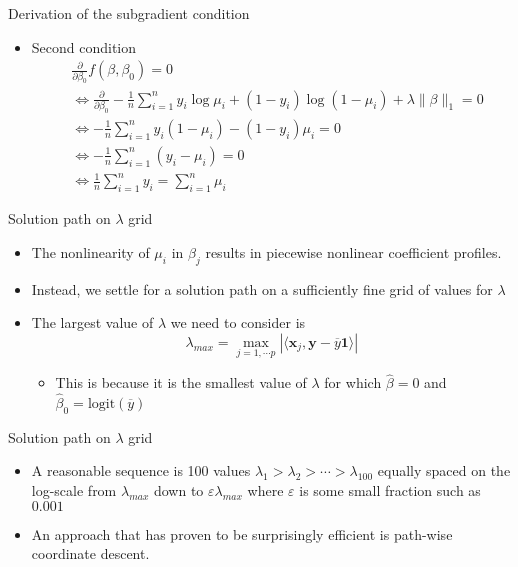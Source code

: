 \documentclass[11pt]{beamer}
\begin{document}
\begin{frame}{Derivation of the subgradient condition}
    \begin{itemize}
        \item Second condition
        \begin{align*}
            &\frac{\partial}{\partial \beta_0}f(\beta, \beta_0)=0 \\
            &\Leftrightarrow \frac{\partial}{\partial \beta_0} -\frac 1 n \sum_{i=1}^n y_i\log \mu_i +(1-y_i)\log(1-\mu_i)+\lambda \|\beta\|_1 =0 \\ 
            &\Leftrightarrow -\frac 1n \sum_{i=1}^n y_i(1-\mu_i) - (1-y_i)\mu_i   =0\\
            &\Leftrightarrow  -\frac 1n \sum_{i=1}^n (y_i-\mu_i) =0\\
            &\Leftrightarrow \frac 1n \sum_{i=1}^n y_i=\sum_{i=1}^n \mu_i
        \end{align*}
    \end{itemize}
\end{frame}

\begin{frame}{Solution path on $\lambda$ grid}
    \begin{itemize}
        \item The nonlinearity of $\mu_i$ in $\beta_j$ results in piecewise nonlinear coefficient profiles.
        \item Instead, we settle for a solution path on a sufficiently fine grid of values for $\lambda$
        \item The largest value of $\lambda$ we need to consider is $$\lambda_{max}= \max_{j=1, \cdots p} |\langle \mathbf{x}_j, \mathbf{y}-\overline{y}\mathbf{1}\rangle|$$
        \begin{itemize}
            \item This is because it is the smallest value of $\lambda$ for which $\hat\beta=0$ and $\hat\beta_0=\text{logit}(\overline{y})$
        \end{itemize}
    \end{itemize}
\end{frame}

\begin{frame}{Solution path on $\lambda$ grid}
    \begin{itemize}
        \item A reasonable sequence is 100 values $\lambda_1>\lambda_2>\cdots >\lambda_{100}$ equally spaced on the log-scale from $\lambda_{max}$ down to $\varepsilon \lambda_{max}$ where $\varepsilon$ is some small fraction such as $0.001$
        \item An approach that has proven to be surprisingly efficient is path-wise coordinate descent.
    \end{itemize}
\end{frame}
\end{document}
